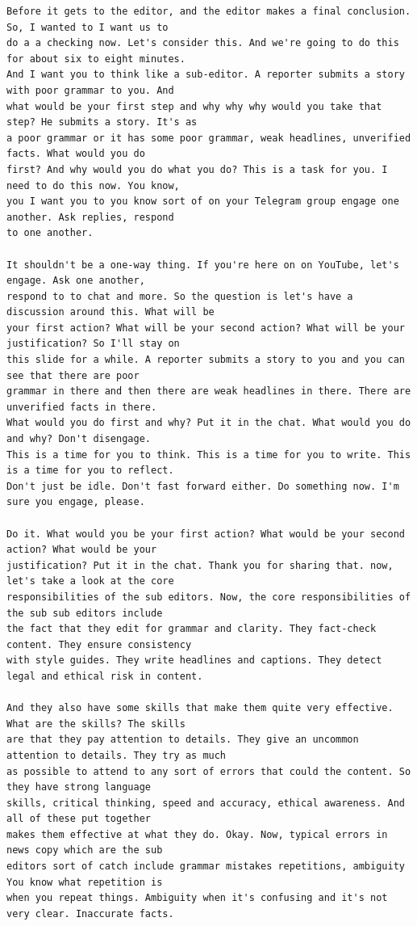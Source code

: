 {\begin{Verbatim}
Before it gets to the editor, and the editor makes a final conclusion. So, I wanted to I want us to
do a a checking now. Let's consider this. And we're going to do this for about six to eight minutes.
And I want you to think like a sub-editor. A reporter submits a story with poor grammar to you. And
what would be your first step and why why why would you take that step? He submits a story. It's as
a poor grammar or it has some poor grammar, weak headlines, unverified facts. What would you do
first? And why would you do what you do? This is a task for you. I need to do this now. You know,
you I want you to you know sort of on your Telegram group engage one another. Ask replies, respond
to one another.

It shouldn't be a one-way thing. If you're here on on YouTube, let's engage. Ask one another,
respond to to chat and more. So the question is let's have a discussion around this. What will be
your first action? What will be your second action? What will be your justification? So I'll stay on
this slide for a while. A reporter submits a story to you and you can see that there are poor
grammar in there and then there are weak headlines in there. There are unverified facts in there.
What would you do first and why? Put it in the chat. What would you do and why? Don't disengage.
This is a time for you to think. This is a time for you to write. This is a time for you to reflect.
Don't just be idle. Don't fast forward either. Do something now. I'm sure you engage, please.

Do it. What would you be your first action? What would be your second action? What would be your
justification? Put it in the chat. Thank you for sharing that. now, let's take a look at the core
responsibilities of the sub editors. Now, the core responsibilities of the sub sub editors include
the fact that they edit for grammar and clarity. They fact-check content. They ensure consistency
with style guides. They write headlines and captions. They detect legal and ethical risk in content.

And they also have some skills that make them quite very effective. What are the skills? The skills
are that they pay attention to details. They give an uncommon attention to details. They try as much
as possible to attend to any sort of errors that could the content. So they have strong language
skills, critical thinking, speed and accuracy, ethical awareness. And all of these put together
makes them effective at what they do. Okay. Now, typical errors in news copy which are the sub
editors sort of catch include grammar mistakes repetitions, ambiguity You know what repetition is
when you repeat things. Ambiguity when it's confusing and it's not very clear. Inaccurate facts.


\end{Verbatim}}
